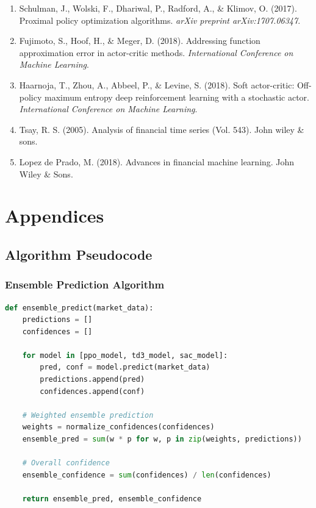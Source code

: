 \documentclass[11pt,a4paper]{article}
\begin{document}
\begin{enumerate}
    \item Schulman, J., Wolski, F., Dhariwal, P., Radford, A., \& Klimov, O. (2017). Proximal policy optimization algorithms. \textit{arXiv preprint arXiv:1707.06347}.

    \item Fujimoto, S., Hoof, H., \& Meger, D. (2018). Addressing function approximation error in actor-critic methods. \textit{International Conference on Machine Learning}.

    \item Haarnoja, T., Zhou, A., Abbeel, P., \& Levine, S. (2018). Soft actor-critic: Off-policy maximum entropy deep reinforcement learning with a stochastic actor. \textit{International Conference on Machine Learning}.

    \item Tsay, R. S. (2005). Analysis of financial time series (Vol. 543). John wiley \& sons.

    \item Lopez de Prado, M. (2018). Advances in financial machine learning. John Wiley \& Sons.
\end{enumerate}

\appendix

\section{Appendices}

\subsection{Algorithm Pseudocode}

\subsubsection{Ensemble Prediction Algorithm}
\begin{lstlisting}[language=Python]
def ensemble_predict(market_data):
    predictions = []
    confidences = []

    for model in [ppo_model, td3_model, sac_model]:
        pred, conf = model.predict(market_data)
        predictions.append(pred)
        confidences.append(conf)

    # Weighted ensemble prediction
    weights = normalize_confidences(confidences)
    ensemble_pred = sum(w * p for w, p in zip(weights, predictions))

    # Overall confidence
    ensemble_confidence = sum(confidences) / len(confidences)

    return ensemble_pred, ensemble_confidence
\end{lstlisting}
\end{document}
